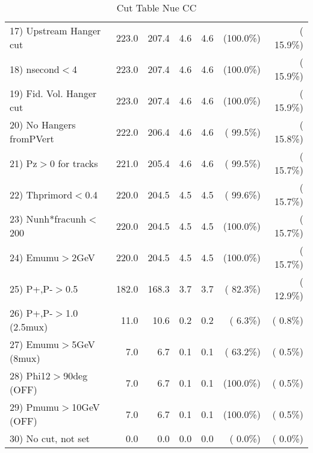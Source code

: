 \begin{table}[h!]
\begin{tabular}{||l||r|r|r|r|r|r||}
 17) Upstream Hanger cut  &        223.0 &        207.4 &          4.6 &          4.6 & (100.0\%) & ( 15.9\%) \\
 18) nsecond$<$4          &        223.0 &        207.4 &          4.6 &          4.6 & (100.0\%) & ( 15.9\%) \\
 19) Fid. Vol. Hanger cut &        223.0 &        207.4 &          4.6 &          4.6 & (100.0\%) & ( 15.9\%) \\
 20) No Hangers fromPVert &        222.0 &        206.4 &          4.6 &          4.6 & ( 99.5\%) & ( 15.8\%) \\
 21) Pz$>$0 for tracks    &        221.0 &        205.4 &          4.6 &          4.6 & ( 99.5\%) & ( 15.7\%) \\
 22) Thprimord$<$0.4      &        220.0 &        204.5 &          4.5 &          4.5 & ( 99.6\%) & ( 15.7\%) \\
 23) Nunh*fracunh$<$200   &        220.0 &        204.5 &          4.5 &          4.5 & (100.0\%) & ( 15.7\%) \\
 24) Emumu$>$2GeV         &        220.0 &        204.5 &          4.5 &          4.5 & (100.0\%) & ( 15.7\%) \\
 25) P+,P-$>$0.5          &        182.0 &        168.3 &          3.7 &          3.7 & ( 82.3\%) & ( 12.9\%) \\
 26) P+,P-$>$1.0 (2.5mux) &         11.0 &         10.6 &          0.2 &          0.2 & (  6.3\%) & (  0.8\%) \\
 27) Emumu$>$5GeV  (8mux) &          7.0 &          6.7 &          0.1 &          0.1 & ( 63.2\%) & (  0.5\%) \\
 28) Phi12$>$90deg  (OFF) &          7.0 &          6.7 &          0.1 &          0.1 & (100.0\%) & (  0.5\%) \\
 29) Pmumu$>$10GeV  (OFF) &          7.0 &          6.7 &          0.1 &          0.1 & (100.0\%) & (  0.5\%) \\
 30) No cut, not set      &          0.0 &          0.0 &          0.0 &          0.0 & (  0.0\%) & (  0.0\%) \\
 \hline
 \hline
 \end{tabular}
 \caption{Cut Table   Nue CC  }
 \label{tab-cutheavy_neutrino_1.500}
 \end{table}

